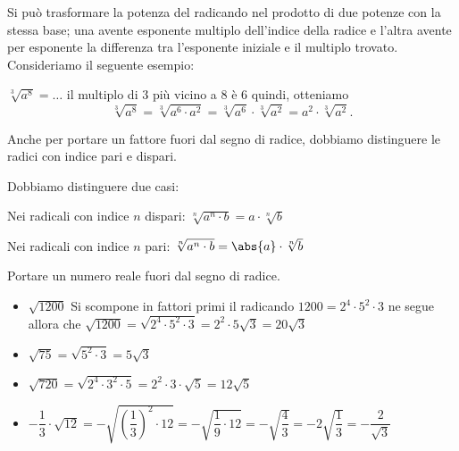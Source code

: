 Si può trasformare la potenza del radicando nel 
prodotto di due potenze con la stessa base; una avente esponente multiplo 
dell'indice della radice e l'altra avente per esponente la differenza tra 
l'esponente iniziale e il multiplo trovato. Consideriamo il seguente 
esempio:

\(\sqrt[3]{a^8}=\ldots \) il multiplo di \(3\) più vicino a \(8\) è \(6\) 
quindi, 
otteniamo 
\[\sqrt[3]{a^8}=\sqrt[3]{a^6\cdot a^2}=\sqrt[3]{a^6}\cdot \sqrt[3]{a^2}=
a^2\cdot \sqrt[3]{a^2}.\]


Anche per portare un fattore fuori dal segno di radice, dobbiamo distinguere 
le radici con indice pari e dispari.
\begin{definizione}
Dobbiamo distinguere due casi:

Nei radicali con indice \(n\) dispari: \quad
\(\sqrt[n]{a^n \cdot b} = a \cdot \sqrt[n]{b}\)

Nei radicali con indice \(n\) pari: \quad
\(\sqrt[n]{a^n \cdot b} = \abs{a} \cdot \sqrt[n]{b}\)
\end{definizione}


 \begin{esempio}
 Portare un numero reale fuori dal segno di radice.
\begin{itemize}
 \item \(\sqrt{1200}\) Si scompone in fattori primi il radicando 
       \(1200=2^4\cdot 5^2\cdot 3\) ne segue allora che 
       \(\sqrt{1200}=\sqrt{2^4\cdot 5^2\cdot 3}=2^2\cdot 
5\sqrt{3}=20\sqrt{3}\)
 \item \(\sqrt{75}=\sqrt{5^2\cdot 3}=5\sqrt{3}\)
 \item \(\sqrt{720}=\sqrt{2^4\cdot 3^2\cdot 5}=
        2^2\cdot 3\cdot \sqrt 5=12\sqrt 5\)
 \item \(-\dfrac 1 3\cdot \sqrt{12} =
         -\sqrt{\left(\dfrac 1 3\right)^2\cdot 12} =
        -\sqrt{\dfrac 1 9\cdot 12} = -\sqrt{\dfrac 4 3} =
        -2 \sqrt{\dfrac{1}{3}} = -\dfrac{2}{\sqrt{3}}\)
\end{itemize}
 \end{esempio}

